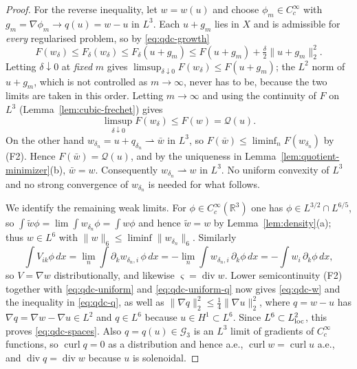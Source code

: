 \documentclass[11pt]{article}
\theoremstyle{definition}
\theoremstyle{plain}
\newcommand{\R}{\mathbb R}
\newcommand{\norm}[1]{\lVert #1\rVert}
\begin{document}
\begin{proof}
For the reverse inequality, let $w=w(u)$ and choose $\phi_m\in C_c^\infty$
with $g_m=\nabla\phi_m\to q(u)=w-u$ in $L^3$.  Each $u+g_m$ lies in $X$ and
is admissible for \emph{every} regularised problem, so by
\eqref{eq:qdc-growth}
\[
 F(w_\delta)\le F_\delta(w_\delta)\le F_\delta(u+g_m)
 \le F(u+g_m)+\tfrac\delta2\norm{u+g_m}_2^2 .
\]
Letting $\delta\downarrow0$ at \emph{fixed} $m$ gives
$\limsup_{\delta\downarrow0}F(w_\delta)\le F(u+g_m)$; the $L^2$ norm of
$u+g_m$, which is not controlled as $m\to\infty$, never has to be, because
the two limits are taken in this order.  Letting $m\to\infty$ and using the
continuity of $F$ on $L^3$ (Lemma~\ref{lem:cubic-frechet}) gives
\[
 \limsup_{\delta\downarrow0}F(w_\delta)\le F(w)=\mathcal Q(u).
\]
On the other hand $w_{\delta_n}=u+q_{\delta_n}\rightharpoonup\bar w$ in
$L^3$, so $F(\bar w)\le\liminf_nF(w_{\delta_n})$ by (F2).  Hence
$F(\bar w)=\mathcal Q(u)$, and by the uniqueness in
Lemma~\ref{lem:quotient-minimizer}(b), $\bar w=w$.  Consequently
$w_{\delta_n}\rightharpoonup w$ in $L^3$.  No uniform convexity of $L^3$ and
no strong convergence of $w_{\delta_n}$ is needed for what follows.

We identify the remaining weak limits.  For $\phi\in C_c^\infty(\R^3)$ one
has $\phi\in L^{3/2}\cap L^{6/5}$, so
$\int\tilde w\phi=\lim\int w_{\delta_n}\phi=\int w\phi$ and hence
$\tilde w=w$ by Lemma~\ref{lem:density}(a); thus $w\in L^6$ with
$\norm w_6\le\liminf\norm{w_{\delta_n}}_6$.  Similarly
\[
 \int V_{ik}\phi\,dx=\lim_n\int\partial_kw_{\delta_n,i}\,\phi\,dx
 =-\lim_n\int w_{\delta_n,i}\,\partial_k\phi\,dx
 =-\int w_i\,\partial_k\phi\,dx ,
\]
so $V=\nabla w$ distributionally, and likewise
$\varsigma=\operatorname{div}w$.  Lower semicontinuity (F2) together with
\eqref{eq:qdc-uniform} and \eqref{eq:qdc-uniform-q} now gives
\eqref{eq:qdc-w} and the inequality in \eqref{eq:qdc-q}, as well as
$\norm{\nabla q}_2^2\le\frac14\norm{\nabla u}_2^2$, where
$q=w-u$ has $\nabla q=\nabla w-\nabla u\in L^2$ and $q\in L^6$ because
$u\in H^1\subset L^6$.  Since $L^6\subset L^2_{\rm loc}$, this proves
\eqref{eq:qdc-spaces}.  Also $q=q(u)\in\mathcal G_3$ is an $L^3$ limit of
gradients of $C_c^\infty$ functions, so $\operatorname{curl}q=0$ as a
distribution and hence a.e., $\operatorname{curl}w=\operatorname{curl}u$ a.e.,
and $\operatorname{div}q=\operatorname{div}w$ because $u$ is solenoidal.


\end{proof}
\end{document}
